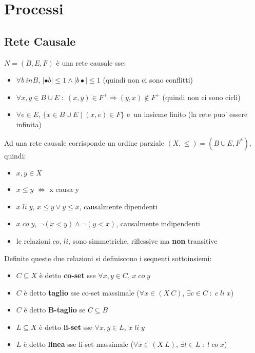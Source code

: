 \chapter{Processi}

\section{Rete Causale}

$N = (B, E, F)$ \`e una rete causale sse:
\begin{itemize}
    \item $\forall b \ in B$, $|\bullet b| \leq 1 \land |b \bullet| \leq 1$ (quindi non ci sono conflitti)
    \item $\forall x,y \in B \cup E \; : \; (x, y) \in F^+ \Rightarrow (y, x) \notin F^+$ (quindi non ci sono cicli)
    \item $\forall e \in E$, $\{ x \in B \cup E \; | \; (x, e) \in F \}$ e\ un insieme finito (la rete puo' essere infinita)
\end{itemize}

Ad una rete causale corrisponde un ordine parziale $(X, \leq) = (B \cup E, F^*)$, quindi:

\begin{itemize}
    \item $x,y \in X$
    \item $x \leq y$ $\Leftrightarrow$ x causa y
    \item $x \; li \; y$, $x \leq y \lor y \leq x$, causalmente dipendenti
    \item $x \; co \; y$, $\neg (x < y) \land \neg (y < x)$, causalmente indipendenti
    \item le relazioni $co$, $li$, sono simmetriche, riflessive ma \textbf{non} transitive
\end{itemize}

Definite queste due relazioni si definiscono i sequenti sottoinsiemi:

\begin{itemize}
    \item $C \subseteq X$ \`e detto \textbf{co-set} sse $\forall x,y \in C$, $x \; co \; y$
    \item $C$ \`e detto \textbf{taglio} sse co-set massimale ($\forall x \in (X \ C)$, $\exists c \in C \; : \; c \; li \; x$)
    \item $C$ \`e detto \textbf{B-taglio} se $C \subseteq B$
    \item $L \subseteq X$ \`e detto \textbf{li-set} sse $\forall x,y \in L$, $x \; li \; y$
    \item $L$ \`e detto \textbf{linea} sse li-set massimale ($\forall x \in (X \ L)$, $\exists l \in L \; : \; l \; co \; x$)
\end{itemize}

